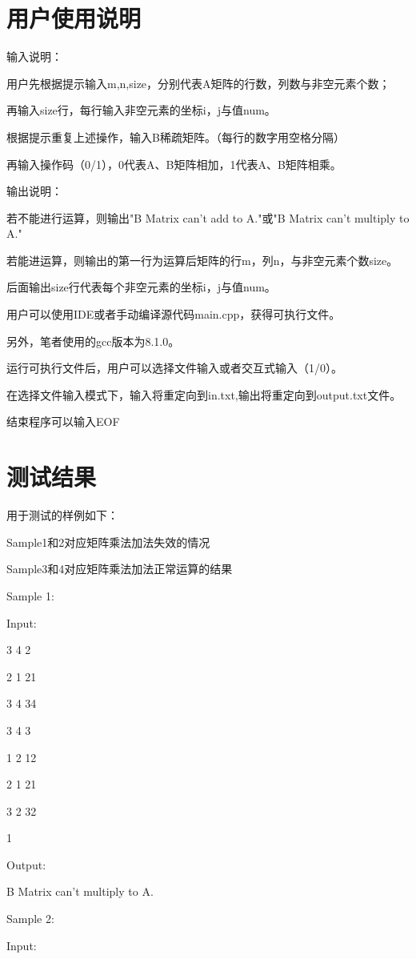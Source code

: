 \section{用户使用说明}
输入说明：

用户先根据提示输入m,n,size，分别代表A矩阵的行数，列数与非空元素个数；

再输入size行，每行输入非空元素的坐标i，j与值num。

根据提示重复上述操作，输入B稀疏矩阵。（每行的数字用空格分隔）

再输入操作码（0/1），0代表A、B矩阵相加，1代表A、B矩阵相乘。

输出说明：

若不能进行运算，则输出"B Matrix can't add to A."或"B Matrix can't multiply to A."

若能进运算，则输出的第一行为运算后矩阵的行m，列n，与非空元素个数size。

后面输出size行代表每个非空元素的坐标i，j与值num。

用户可以使用IDE或者手动编译源代码main.cpp，获得可执行文件。

另外，笔者使用的gcc版本为8.1.0。   

运行可执行文件后，用户可以选择文件输入或者交互式输入（1/0）。

在选择文件输入模式下，输入将重定向到in.txt,输出将重定向到output.txt文件。

结束程序可以输入EOF

\section{测试结果}
用于测试的样例如下：

Sample1和2对应矩阵乘法加法失效的情况

Sample3和4对应矩阵乘法加法正常运算的结果

Sample 1:

   Input:

   3 4 2

   2 1 21

   3 4 34

   3 4 3

   1 2 12

   2 1 21

   3 2 32

   1

   Output:

   B Matrix can't multiply to A.

Sample 2:

   Input:


